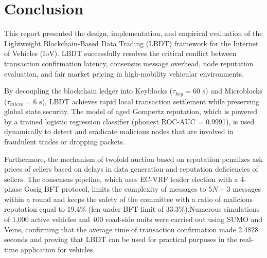 \section{Conclusion}\label{sec:conclusion_main}
\noindent This report presented the design, implementation, and empirical evaluation of the Lightweight Blockchain-Based Data Trading (LBDT) framework for the Internet of Vehicles (IoV). LBDT successfully resolves the critical conflict between transaction confirmation latency, consensus message overhead, node reputation evaluation, and fair market pricing in high-mobility vehicular environments.

By decoupling the blockchain ledger into Keyblocks ($\tau_{key} = 60\text{ s}$) and Microblocks ($\tau_{micro} = 6\text{ s}$), LBDT achieves rapid local transaction settlement while preserving global state security. The model of aged Gompertz reputation, which is powered by a trained logistic regression classifier (phonest ROC-AUC = 0.9991), is used dynamically to detect and eradicate malicious nodes that are involved in fraudulent trades or dropping packets.

Furthermore, the mechanism of twofold auction based on reputation penalizes ask prices of sellers based on delays in data generation and reputation deficiencies of sellers. 
The consensus pipeline, which uses EC-VRF leader election with a 4-phase Gosig BFT protocol, limits the complexity of messages to $5N-3$ messages within a round and keeps the safety of the committee with a ratio of malicious reputation equal to 19.4\% (len under BFT limit of 33.3\%).Numerous simulations of 1,000 active vehicles and 400 road-side units were carried out using SUMO and Veins, confirming that the average time of transaction confirmation made 2.4828 seconds and proving that LBDT can be used for practical purposes in the real-time application for vehicles.

